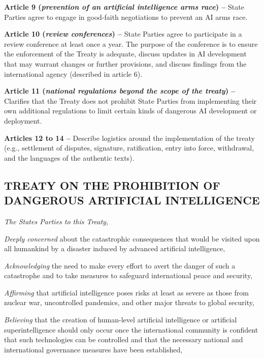 \documentclass[12pt,a4paper]{article}
\begin{document}
\textbf{Article 9 (\textit{prevention of an artificial intelligence arms race}) –} State Parties agree to engage in good-faith negotiations to prevent an AI arms race.

\textbf{Article 10 (\textit{review conferences}) –} State Parties agree to participate in a review conference at least once a year. The purpose of the conference is to ensure the enforcement of the Treaty is adequate, discuss updates in AI development that may warrant changes or further provisions, and discuss findings from the international agency (described in article 6).

\textbf{Article 11 (\textit{national regulations beyond the scope of the treaty}) –} Clarifies that the Treaty does not prohibit State Parties from implementing their own additional regulations to limit certain kinds of dangerous AI development or deployment.

\textbf{Articles 12 to 14 –} Describe logistics around the implementation of the treaty (e.g., settlement of disputes, signature, ratification, entry into force, withdrawal, and the languages of the authentic texts). 


\newpage

\begin{center}

{}
\section*{\textbf{TREATY ON THE PROHIBITION OF DANGEROUS ARTIFICIAL INTELLIGENCE }}
\end{center}

\textit{The States Parties to this Treaty},

\textit{Deeply concerned} about the catastrophic consequences that would be visited upon all humankind by a disaster induced by advanced artificial intelligence,

\textit{Acknowledging} the need to make every effort to avert the danger of such a catastrophe and to take measures to safeguard international peace and security,

\textit{Affirming} that artificial intelligence poses risks at least as severe as those from nuclear war, uncontrolled pandemics, and other major threats to global security,

\textit{Believing} that the creation of human-level artificial intelligence or artificial superintelligence should only occur once the international community is confident that such technologies can be controlled and that the necessary national and international governance measures have been established,
\end{document}
